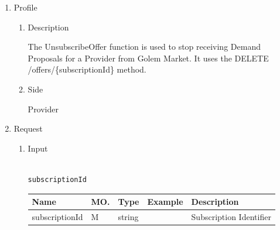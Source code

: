 
\begin{enumerate}

\item Profile

\begin{enumerate}

\item Description

The UnsubscribeOffer function is used to stop receiving Demand Proposals for a Provider from Golem Market. 
It uses the DELETE /offers/\{subscriptionId\} method.

\item Side

Provider

\end{enumerate}

\item Request

\begin{enumerate}

\item Input

\begin{tcolorbox}[boxrule=0pt, frame empty]
\begin{verbatim}

subscriptionId

\end{verbatim}
\end{tcolorbox}





\begin{table}[H]
\footnotesize

\begin{center}
\begin{tabular}{|p{3cm}|l|p{3cm}|p{3cm}|p{4cm}|} 
\hline
\rowcolor{lightgray}	Name	& MO.	& Type	& Example & 	Description \\
\hline

subscriptionId	& M	& 	string	&		&	Subscription Identifier \\ 


\end{tabular}
\end{center}
\end{table}
\end{enumerate}
\end{enumerate}

